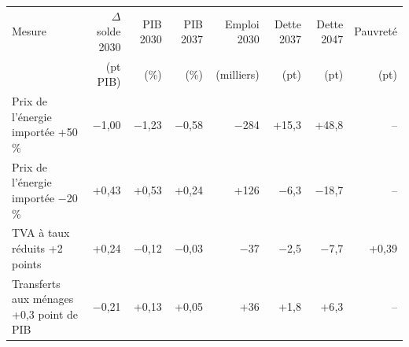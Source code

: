 \begin{tabular}{p{5.2cm}rrrrrrr}
\toprule
Mesure & $\Delta$solde 2030 & PIB 2030 & PIB 2037 & Emploi 2030 & Dette 2037 & Dette 2047 & Pauvreté \\
 & (pt PIB) & (\%) & (\%) & (milliers) & (pt) & (pt) & (pt) \\
\midrule
Prix de l'énergie importée +50 \% & $-$1{,}00 & $-$1{,}23 & $-$0{,}58 & $-$284 & +15{,}3 & +48{,}8 & -- \\
Prix de l'énergie importée −20 \% & +0{,}43 & +0{,}53 & +0{,}24 & +126 & $-$6{,}3 & $-$18{,}7 & -- \\
TVA à taux réduits +2 points & +0{,}24 & $-$0{,}12 & $-$0{,}03 & $-$37 & $-$2{,}5 & $-$7{,}7 & +0{,}39 \\
Transferts aux ménages +0,3 point de PIB & $-$0{,}21 & +0{,}13 & +0{,}05 & +36 & +1{,}8 & +6{,}3 & -- \\
\bottomrule
\end{tabular}
